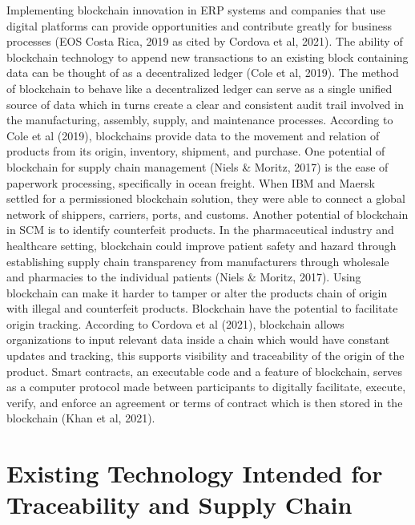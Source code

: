 Implementing blockchain innovation in ERP systems and companies that use digital platforms can  provide opportunities and contribute greatly for business processes (EOS Costa Rica, 2019 as cited by Cordova et al, 2021).  The ability of blockchain technology to append new transactions to an existing block containing data can be thought of as a decentralized ledger (Cole et al, 2019). The method of blockchain to behave like a decentralized ledger can serve as a single unified source of data which in turns create a clear and consistent audit trail involved in the manufacturing, assembly, supply, and maintenance processes. According to Cole et al (2019), blockchains provide data to the movement and relation of products from its origin, inventory, shipment, and purchase. One potential of blockchain for supply chain management (Niels \& Moritz, 2017) is the ease of paperwork processing, specifically in ocean freight. When IBM and Maersk settled for a permissioned blockchain solution, they were able to connect a global network of shippers, carriers, ports, and customs. Another potential of blockchain in SCM is to identify counterfeit products. In the pharmaceutical industry and healthcare setting, blockchain could improve patient safety and hazard through establishing supply chain transparency from manufacturers through wholesale and pharmacies to the individual patients (Niels \& Moritz, 2017). Using blockchain can make it harder to tamper or alter the products chain of origin with illegal and counterfeit products. Blockchain have the potential to facilitate origin tracking. According to Cordova et al (2021), blockchain allows organizations to input relevant data inside a chain which would have constant updates and tracking, this supports visibility and traceability of the origin of the product. Smart contracts, an executable code and a feature of blockchain, serves as a computer protocol made between participants to digitally facilitate, execute, verify, and enforce an agreement or terms of contract which is then stored in the blockchain (Khan et al, 2021).

\section{Existing Technology Intended for Traceability and Supply Chain}

